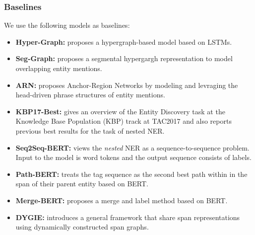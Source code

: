 \documentclass[11pt,a4paper]{article}
\newenvironment{tightitemize}{\begin{itemize}[topsep=0pt, partopsep=0pt] \setlength{\itemsep}{0pt}\setlength{\parskip}{0pt}}{\end{itemize}}
\begin{document}
\subsubsection{Baselines} 
We use the following models as baselines:
\begin{tightitemize}
\item {\bf Hyper-Graph:}  proposes a hypergraph-based model based on LSTMs. 
\item {\bf Seg-Graph:}  proposes a  segmental hypergargh representation to model overlapping entity mentions. 
\item {\bf ARN:}  proposes Anchor-Region Networks by modeling and levraging the head-driven phrase structures of entity mentions. 
\item {\bf KBP17-Best:}  gives an overview of the Entity Discovery task at the Knowledge Base Population (KBP) track at TAC2017 and also reports previous best results for the task of nested NER. 
\item {\bf Seq2Seq-BERT:}  views the {\em nested} NER as a sequence-to-sequence problem. Input to the model is word tokens and the output sequence consists of labels.  
\item {\bf Path-BERT:}  treats the tag sequence as the second best path within in the span of their parent entity based on BERT. 
\item {\bf Merge-BERT:}  proposes a merge and label method based on BERT. 
\item {\bf DYGIE:}  introduces a general framework that share span representations using dynamically constructed span graphs. 
\end{tightitemize}
\end{document}

